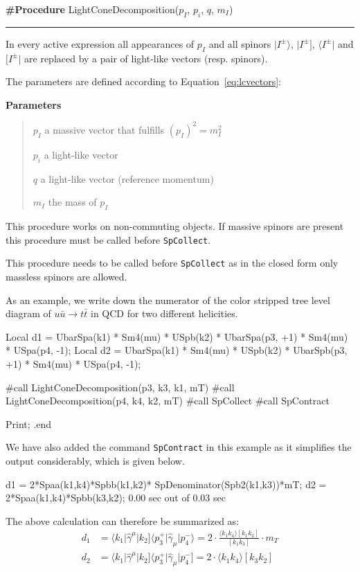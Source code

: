 \documentclass[preprint,number,12pt,sort&compress]{elsarticle}
\newcommand{\bra}[1]{\langle #1 \vert}
\newcommand{\brb}[1]{[ #1 \vert}
\newcommand{\kea}[1]{\vert #1 \rangle}
\newcommand{\keb}[1]{\vert #1 ]}
\newcommand{\Spaa}[1]{\langle #1 \rangle}
\newcommand{\Spab}[1]{\langle #1]}
\newcommand{\Spbb}[1]{[ #1 ]}
\newlength{\funcindent}
\newlength{\funcwidth}
\newenvironment{Ventry}[1]%
 {\begin{list}{}{%
   \renewcommand{\makelabel}[1]{\texttt{##1:}\hfil}%
   \settowidth{\labelwidth}{\texttt{#1:}}%
   \setlength{\leftmargin}{\labelsep}%
   \addtolength{\leftmargin}{\labelwidth}}}%
 {\end{list}}
\newenvironment{Procedure}[2]{%
\hspace{.8\funcindent}\begin{boxedminipage}{\funcwidth}
	\raggedright \textbf{\#Procedure} #1(#2)

	\vspace{-1.5ex}

	\rule{\textwidth}{0.5\fboxrule}
	\setlength{\parskip}{2ex}
}{\end{boxedminipage}}
\newenvironment{Parameters}{%
	\setlength{\parskip}{1ex}
	\textbf{Parameters}
	\vspace{-1ex}
	\begin{quote}}{%
	\end{quote}}
\begin{document}
\medskip
\begin{Procedure}{LightConeDecomposition}{$p_I$, $p_i$, $q$, $m_I$}
	In every active expression all appearances of $p_I$ and all
	spinors $\kea{I^\pm}$, $\keb{I^\pm}$, $\bra{I^\pm}$ and
	$\brb{I^\pm}$ are replaced by a pair of light-like vectors
	(resp. spinors).

	The parameters are defined according to Equation~\eqref{eq:lcvectors}:

	\begin{Parameters}
		\begin{Ventry}{$m_I$}
			\item[$p_I$] a massive vector that fulfills $(p_I)^2=m_I^2$
			\item[$p_i$] a light-like vector
			\item[$q$] a light-like vector (reference momentum)
			\item[$m_I$] the mass of $p_I$
		\end{Ventry}
	\end{Parameters}

	This procedure works on non-commuting objects. If massive spinors
	are present this procedure must be called before \texttt{SpCollect}.
\end{Procedure}

\medskip
This procedure needs to be called before \texttt{SpCollect} as
in the closed form only massless spinors are allowed.

As an example, we write down the numerator of the color stripped
tree level diagram of
$u\bar{u}\rightarrow t\bar{t}$ in QCD for two different helicities.

\begin{spform}
Local d1 = UbarSpa(k1) * Sm4(mu) * USpb(k2) *
           UbarSpa(p3, +1) * Sm4(mu) * USpa(p4, -1);
Local d2 = UbarSpa(k1) * Sm4(mu) * USpb(k2) *
           UbarSpb(p3, +1) * Sm4(mu) * USpa(p4, -1);

#call LightConeDecomposition(p3, k3, k1, mT)
#call LightConeDecomposition(p4, k4, k2, mT)
#call SpCollect
#call SpContract

Print;
.end
\end{spform}
We have also added the command \texttt{SpContract} in this example
as it simplifies the output considerably, which is given below.
\begin{form}
   d1 = 2*Spaa(k1,k4)*Spbb(k1,k2)*
        SpDenominator(Spb2(k1,k3))*mT;
   d2 = 2*Spaa(k1,k4)*Spbb(k3,k2);
  0.00 sec out of 0.03 sec
\end{form}
The above calculation can therefore be summarized as:
\begin{align*}
d_1&=\Spab{k_1\vert\hat{\gamma}^\mu\vert k_2}%
     \Spaa{p_3^+\vert\hat{\gamma}_\mu\vert p_4^-}=
	  2\cdot\frac{\Spaa{k_1k_4}\Spbb{k_1k_2}}{\Spbb{k_1k_3}}\cdot m_T\\
d_2&=\Spab{k_1\vert\hat{\gamma}^\mu\vert k_2}%
     \Spab{p_3^+\vert\hat{\gamma}_\mu\vert p_4^-}=
	  2\cdot\Spaa{k_1k_4}\Spbb{k_3k_2}
\end{align*}
\end{document}
